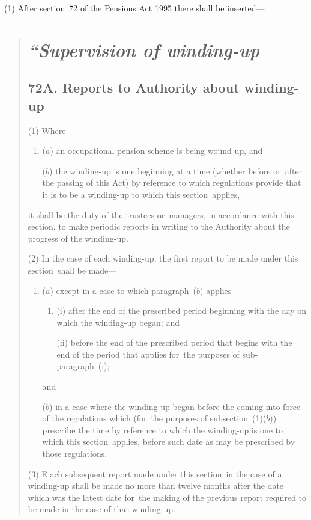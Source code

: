 \documentclass[12pt,a4paper]{article}
\begin{document}
(1) After section~72 of the Pensions Act 1995 there shall be inserted—
\begin{quotation}
\section*{\itshape “Supervision of winding-up}

\subsection*{72A. Reports to Authority about winding-up}

(1) Where—
\begin{enumerate}\item[]
($a$) an occupational pension scheme is being wound up, and

($b$) the winding-up is one beginning at a time (whether before or~after the passing of this Act) by reference to which regulations provide that it is to be a winding-up to which this section~applies,
\end{enumerate}
it shall be the duty of the trustees or~managers, in accordance with this section, to make periodic reports in writing to the Authority about the progress of the winding-up.

(2) In the case of each winding-up, the first report to be made under this section~shall be made—
\begin{enumerate}\item[]
($a$) except in a case to which paragraph~($b$)  applies—
\begin{enumerate}\item[]
(i) after the end of the prescribed period beginning with the day on which the winding-up began; and

(ii) before the end of the prescribed period that begins with the end of the period that applies for~the purposes of sub-paragraph~(i);
\end{enumerate}
and

($b$) in a case where the winding-up began before the coming into force of the regulations which (for~the purposes of subsection~(1)($b$)) prescribe the time by reference to which the winding-up is one to which this section~applies, before such date as may be prescribed by those regulations.
\end{enumerate}

(3) E%
ach subsequent report made under this section~in the case of a winding-up shall be made no more than twelve months after the date which 
was the latest date for~the making of the previous report required to be made in the case of that winding-up.


\end{quotation}
\end{document}
